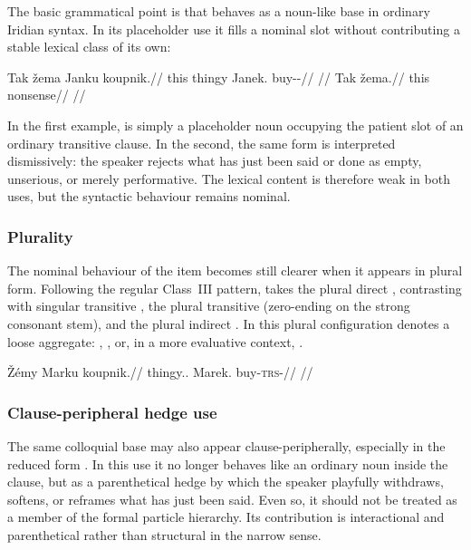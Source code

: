 The basic grammatical point is that  behaves as a noun-like base in
ordinary Iridian syntax. In its placeholder use it fills a nominal slot without
contributing a stable lexical class of its own:

\pex
\a
\begingl
\gla Tak žema Janku koupnik.//
\glb this thingy Janek.\Trs{} buy-\Trs{}-\Pf{}//
\glft {}//
\endgl
\a
\begingl
\gla Tak žema.//
\glb this nonsense//
\glft {}//
\endgl
\xe

In the first example,  is simply a placeholder noun occupying the
patient slot of an ordinary transitive clause. In the second, the same form is
interpreted dismissively: the speaker rejects what has just been said or done as
empty, unserious, or merely performative. The lexical content is therefore weak
in both uses, but the syntactic behaviour remains nominal.

\subsubsection{Plurality}

The nominal behaviour of the item becomes still clearer when it appears in
plural form. Following the regular Class~III  pattern,
 takes the plural direct
, contrasting with singular transitive , the plural
transitive  (zero-ending on the strong consonant stem), and the
plural indirect . In this plural configuration  denotes a loose aggregate:
, , or, in a more evaluative
context, .

\ex
\begingl
\gla Žémy Marku koupnik.//
\glb thingy.\Dir{}.\Pl{} Marek.\Trs{} buy-\textsc{trs}-\Pf{}//
\glft {}//
\endgl
\xe

\subsubsection{Clause-peripheral hedge use}

The same colloquial base may also appear clause-peripherally, especially in the
reduced form . In this use it no longer behaves like an ordinary noun
inside the clause, but as a parenthetical hedge by which the speaker playfully
withdraws, softens, or reframes what has just been said. Even so, it should not
be treated as a member of the formal particle hierarchy. Its contribution is
interactional and parenthetical rather than structural in the narrow sense.

